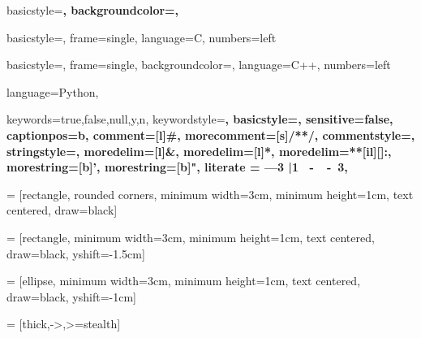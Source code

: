    {basicstyle=\scriptsize\bf\ttfamily,
    backgroundcolor=\color{gray75},    
    }

   {basicstyle=\scriptsize,
	frame=single,
	language=C,
	numbers=left
   }
   
   {basicstyle=\small,
	frame=single,
	backgroundcolor=\color{gray75},
	language=C++,
	numbers=left
   }

   {language=Python,    
   }

{
   keywords={true,false,null,y,n},
   keywordstyle=\bfseries,
   basicstyle=\bfseries,
   sensitive=false,
   captionpos=b,
   comment=[l]{\#},
   morecomment=[s]{/*}{*/},
   commentstyle=\ttfamily,
   stringstyle=\mdseries\ttfamily,
   moredelim=[l]{\&},
   moredelim=[l]{*},
   moredelim=**[il][\mdseries{:}\mdseries]{:},
   morestring=[b]',
   morestring=[b]",
   literate =  {---}{{\llap{\mdseries-{-}-}}}3    
               {|}{{\textbar}}1 
               {\ -\ }{{\mdseries\ -\ }}3,
}


\usepackage[textwidth=2.5cm, textsize=smaller]{todonotes}
\setlength{\marginparwidth}{2.5cm}

\usepackage{lipsum}

\usepackage{relsize}

\usepackage{blindtext}
\linespread{1.3}

\usepackage{tikz}
\usetikzlibrary{shapes, positioning, calc}

 = [rectangle, rounded corners, minimum width=3cm, minimum height=1cm, text centered, draw=black]

 = [rectangle, minimum width=3cm, minimum height=1cm, text centered, draw=black, yshift=-1.5cm]

 = [ellipse, minimum width=3cm, minimum height=1cm, text centered, draw=black, yshift=-1cm]

 = [thick,->,>=stealth]

\usepackage{pgf-umlcd}
\usepackage{csquotes}
\makeatletter
\newcommand*{\shifttext}[2]{%
   \settowidth{\@tempdima}{#2}%
   \makebox[\@tempdima]{\hspace*{#1}#2}%
}
\makeatother